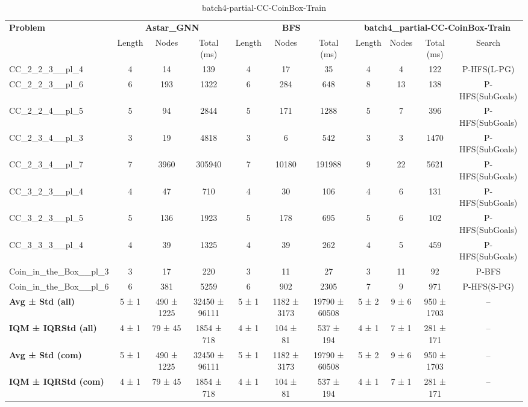 \begin{table}[!ht]
\centering
\scriptsize
\begin{tabular}{l|ccc|ccc|cccc}
\multirow{2}{*}{\textbf{Problem}} & \multicolumn{3}{c|}{\textbf{Astar\_GNN}} & \multicolumn{3}{c|}{\textbf{BFS}} & \multicolumn{4}{c}{\textbf{batch4\_partial-CC-CoinBox-Train}} \\
\cline{2-11}
& Length & Nodes & Total (ms) & Length & Nodes & Total (ms) & Length & Nodes & Total (ms) & Search \\
\hline
CC\_2\_2\_3\_\_pl\_4 & 4 & 14 & 139 & 4 & 17 & 35 & 4 & 4 & 122 & P-HFS(L-PG) \\
CC\_2\_2\_3\_\_pl\_6 & 6 & 193 & 1322 & 6 & 284 & 648 & 8 & 13 & 138 & P-HFS(SubGoals) \\
CC\_2\_2\_4\_\_pl\_5 & 5 & 94 & 2844 & 5 & 171 & 1288 & 5 & 7 & 396 & P-HFS(SubGoals) \\
CC\_2\_3\_4\_\_pl\_3 & 3 & 19 & 4818 & 3 & 6 & 542 & 3 & 3 & 1470 & P-HFS(SubGoals) \\
CC\_2\_3\_4\_\_pl\_7 & 7 & 3960 & 305940 & 7 & 10180 & 191988 & 9 & 22 & 5621 & P-HFS(SubGoals) \\
CC\_3\_2\_3\_\_pl\_4 & 4 & 47 & 710 & 4 & 30 & 106 & 4 & 6 & 131 & P-HFS(SubGoals) \\
CC\_3\_2\_3\_\_pl\_5 & 5 & 136 & 1923 & 5 & 178 & 695 & 5 & 6 & 102 & P-HFS(SubGoals) \\
CC\_3\_3\_3\_\_pl\_4 & 4 & 39 & 1325 & 4 & 39 & 262 & 4 & 5 & 459 & P-HFS(SubGoals) \\
Coin\_in\_the\_Box\_\_pl\_3 & 3 & 17 & 220 & 3 & 11 & 27 & 3 & 11 & 92 & P-BFS \\
Coin\_in\_the\_Box\_\_pl\_6 & 6 & 381 & 5259 & 6 & 902 & 2305 & 7 & 9 & 971 & P-HFS(S-PG) \\
\hline
\textbf{Avg ± Std (all)} & 5 ± 1 & 490 ± 1225 & 32450 ± 96111 & 5 ± 1 & 1182 ± 3173 & 19790 ± 60508 & 5 ± 2 & 9 ± 6 & 950 ± 1703 & -- \\
\textbf{IQM ± IQRStd (all)} & 4 ± 1 & 79 ± 45 & 1854 ± 718 & 4 ± 1 & 104 ± 81 & 537 ± 194 & 4 ± 1 & 7 ± 1 & 281 ± 171 & -- \\
\textbf{Avg ± Std (com)} & 5 ± 1 & 490 ± 1225 & 32450 ± 96111 & 5 ± 1 & 1182 ± 3173 & 19790 ± 60508 & 5 ± 2 & 9 ± 6 & 950 ± 1703 & -- \\
\textbf{IQM ± IQRStd (com)} & 4 ± 1 & 79 ± 45 & 1854 ± 718 & 4 ± 1 & 104 ± 81 & 537 ± 194 & 4 ± 1 & 7 ± 1 & 281 ± 171 & -- \\
\end{tabular}
\caption{batch4-partial-CC-CoinBox-Train}
\label{tab:batch4_partial_CC-CoinBox_comparison_train}
\end{table}

